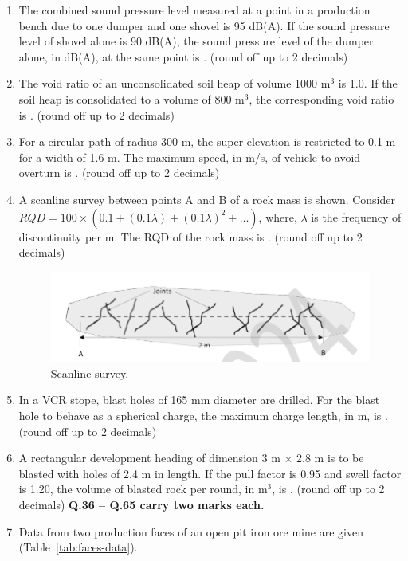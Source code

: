 \documentclass[journal]{IEEEtran}
\begin{document}
\begin{enumerate}[leftmargin=0pt]
\hfill{}
\item The combined sound pressure level measured at a point in a production bench due to one dumper and one shovel is 95 dB(A). If the sound pressure level of shovel alone is 90 dB(A), the sound pressure level of the dumper alone, in dB(A), at the same point is \underline{\hspace{1.5cm}}. (round off up to 2 decimals)
\hfill{}
\item The void ratio of an unconsolidated soil heap of volume 1000 m$^3$ is 1.0. If the soil heap is consolidated to a volume of 800 m$^3$, the corresponding void ratio is \underline{\hspace{1.5cm}}. (round off up to 2 decimals)
\hfill{}
\item For a circular path of radius 300 m, the super elevation is restricted to 0.1 m for a width of 1.6 m. The maximum speed, in m/s, of vehicle to avoid overturn is \underline{\hspace{1.5cm}}. (round off up to 2 decimals)
\hfill{}
\item A scanline survey between points A and B of a rock mass is shown. Consider $RQD = 100 \times (0.1 + (0.1 \lambda) + (0.1 \lambda)^2 + \dots)$, where, $\lambda$ is the frequency of discontinuity per m. The RQD of the rock mass is \underline{\hspace{1.5cm}}. (round off up to 2 decimals)
\begin{figure}[h!]
\centering
\includegraphics[width=0.5\linewidth]{figs/scanlinesurvey.png}
\caption{Scanline survey.}
\label{fig:scanline}
\end{figure}
\hfill{}
\item In a VCR stope, blast holes of 165 mm diameter are drilled. For the blast hole to behave as a spherical charge, the maximum charge length, in m, is \underline{\hspace{1.5cm}}. (round off up to 2 decimals)
\hfill{}
\item A rectangular development heading of dimension 3 m $\times$ 2.8 m is to be blasted with holes of 2.4 m in length. If the pull factor is 0.95 and swell factor is 1.20, the volume of blasted rock per round, in m$^3$, is \underline{\hspace{1.5cm}}. (round off up to 2 decimals)
\hfill{}
\noindent\textbf{Q.36 -- Q.65 carry two marks each.}
\item Data from two production faces of an open pit iron ore mine are given
(Table~\ref{tab:faces-data}).


\end{enumerate}
\end{document}

